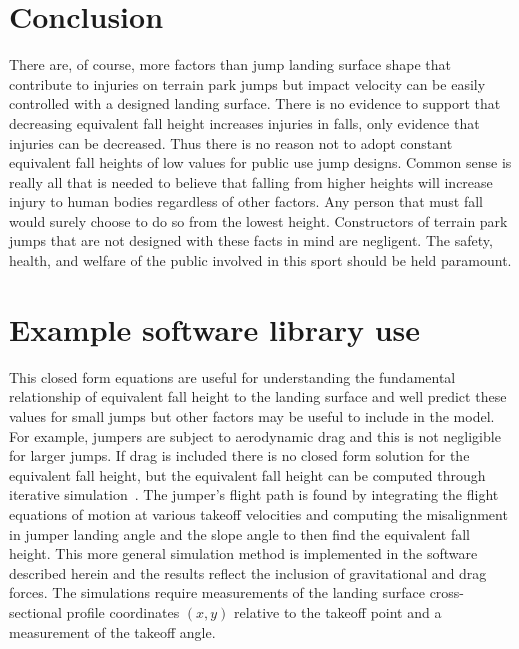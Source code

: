 \documentclass{article}
\begin{document}
\section{Conclusion}
%
There are, of course, more factors than jump landing surface shape that
contribute to injuries on terrain park jumps but impact velocity can be easily
controlled with a designed landing surface. There is no evidence to support
that decreasing equivalent fall height increases injuries in falls, only
evidence that injuries can be decreased. Thus there is no reason not to adopt
constant equivalent fall heights of low values for public use jump designs.
Common sense is really all that is needed to believe that falling from higher
heights will increase injury to human bodies regardless of other factors. Any
person that must fall would surely choose to do so from the lowest height.
Constructors of terrain park jumps that are not designed with these facts in
mind are negligent. The safety, health, and welfare of the public involved in
this sport should be held paramount.




\appendix

\section{Example software library use}
%
This closed form equations are useful for understanding the fundamental
relationship of equivalent fall height to the landing surface and well predict
these values for small jumps but other factors may be useful to include in the
model. For example, jumpers are subject to aerodynamic drag and this is not
negligible for larger jumps. If drag is included there is no closed form
solution for the equivalent fall height, but the equivalent fall height can be
computed through iterative simulation~\cite{Levy2015}. The jumper's flight path
is found by integrating the flight equations of motion at various takeoff
velocities and computing the misalignment in jumper landing angle and the slope
angle to then find the equivalent fall height. This more general simulation
method is implemented in the software described herein and the results reflect
the inclusion of gravitational and drag forces. The simulations require
measurements of the landing surface cross-sectional profile coordinates $(x,y)$
relative to the takeoff point and a measurement of the takeoff angle.
\end{document}
